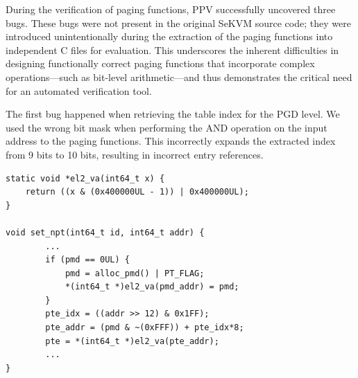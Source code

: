 During the verification of paging functions, PPV successfully uncovered three bugs. These bugs were not present in the original SeKVM source code; they were introduced unintentionally during the extraction of the paging functions into independent C files for evaluation. This underscores the inherent difficulties in designing functionally correct paging functions that incorporate complex operations—such as bit-level arithmetic—and thus demonstrates the critical need for an automated verification tool.

The first bug happened when retrieving the table index for the PGD level.
We used the wrong bit mask when performing the AND operation on the input address to the paging functions. This incorrectly expands the extracted index from 9 bits to 10 bits, resulting in incorrect entry references. %

\begin{listing}
\caption{An Incorrect implementation of \texttt{el2\_va}}
\label{code:el2}
\begin{verbatim}
static void *el2_va(int64_t x) {
	return ((x & (0x400000UL - 1)) | 0x400000UL);
}

void set_npt(int64_t id, int64_t addr) {
        ...
        if (pmd == 0UL) {
            pmd = alloc_pmd() | PT_FLAG;
            *(int64_t *)el2_va(pmd_addr) = pmd;
        }
        pte_idx = ((addr >> 12) & 0x1FF);
        pte_addr = (pmd & ~(0xFFF)) + pte_idx*8;
        pte = *(int64_t *)el2_va(pte_addr);
        ...
}
\end{verbatim}
\end{listing}

